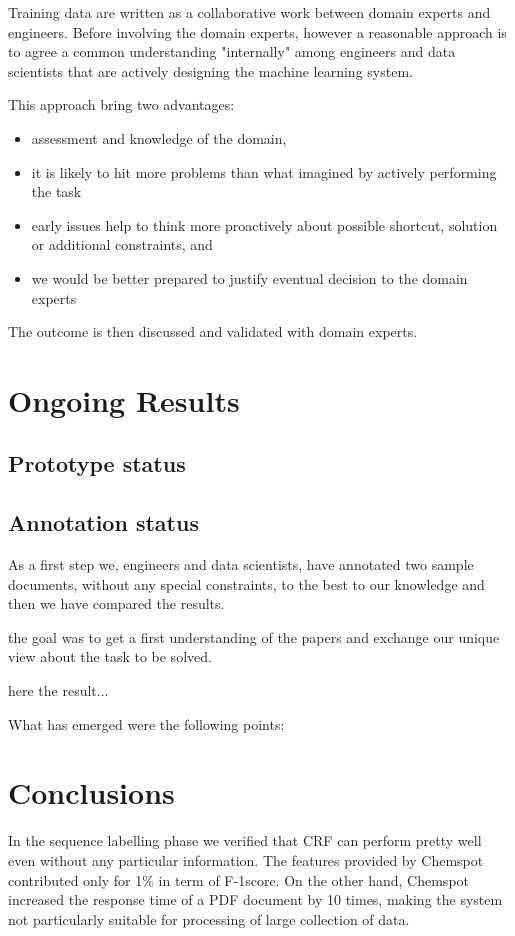 \documentclass{article}
\begin{document}
Training data are written as a collaborative work between domain experts and engineers. Before involving the domain experts, however a reasonable approach is to agree a common understanding "internally" among engineers and data scientists that are actively designing the machine learning system. 

This approach bring two advantages: 
\begin{itemize}
    \item assessment and knowledge of the domain, 
    \item it is likely to hit more problems than what imagined by actively performing the task 
    \item early issues help to think more proactively about possible shortcut, solution or additional constraints, and 
    \item we would be better prepared to justify eventual decision to the domain experts
\end{itemize}

The outcome is then discussed and validated with domain experts. 

\section{Ongoing Results}
\subsection{Prototype status}

\subsection{Annotation status}

As a first step we, engineers and data scientists, have annotated two sample documents, without any special constraints, to the best to our knowledge and then we have compared the results. 

the goal was to get a first understanding of the papers and exchange our unique view about the task to be solved. 

here the result...


What has emerged were the following points: 

\section{Conclusions}
In the sequence labelling phase we verified that CRF can perform pretty well even without any particular information. The features provided by Chemspot contributed only for 1\% in term of F-1score. On the other hand, Chemspot increased the response time of a PDF document by 10 times, making the system not particularly suitable for processing of large collection of data. 
\end{document}
